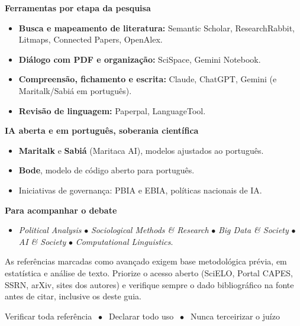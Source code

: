 \documentclass[11pt,a4paper]{article}
\begin{document}
\vspace{4pt}
\textbf{\poppinsmed\color{azulUNI}Ferramentas por etapa da pesquisa}
\begin{itemize}[leftmargin=1.4em,nosep]
\item \textbf{Busca e mapeamento de literatura:} Semantic Scholar, ResearchRabbit, Litmaps, Connected Papers, OpenAlex.
\item \textbf{Diálogo com PDF e organização:} SciSpace, Gemini Notebook.
\item \textbf{Compreensão, fichamento e escrita:} Claude, ChatGPT, Gemini (e Maritalk/Sabiá em português).
\item \textbf{Revisão de linguagem:} Paperpal, LanguageTool.
\end{itemize}

\vspace{4pt}
\textbf{\poppinsmed\color{azulUNI}IA aberta e em português, soberania científica}
\begin{itemize}[leftmargin=1.4em,nosep]
\item \textbf{Maritalk} e \textbf{Sabiá} (Maritaca AI), modelos ajustados ao português.
\item \textbf{Bode}, modelo de código aberto para português.
\item Iniciativas de governança: PBIA e EBIA, políticas nacionais de IA.
\end{itemize}

\vspace{4pt}
\textbf{\poppinsmed\color{azulUNI}Para acompanhar o debate}
\begin{itemize}[leftmargin=1.4em,nosep]
\item \textit{Political Analysis} $\bullet$ \textit{Sociological Methods \& Research} $\bullet$ \textit{Big Data \& Society} $\bullet$ \textit{AI \& Society} $\bullet$ \textit{Computational Linguistics}.
\end{itemize}

\begin{dica}
As referências marcadas como avançado exigem base metodológica prévia, em estatística e análise de texto. Priorize o acesso aberto (SciELO, Portal CAPES, SSRN, arXiv, sites dos autores) e verifique sempre o dado bibliográfico na fonte antes de citar, inclusive os deste guia.
\end{dica}

\vspace{8pt}
\begin{regra}
  \poppins\large\centering
  Verificar toda referência $\;\bullet\;$ Declarar todo uso $\;\bullet\;$ Nunca terceirizar o juízo
\end{regra}
\end{document}
